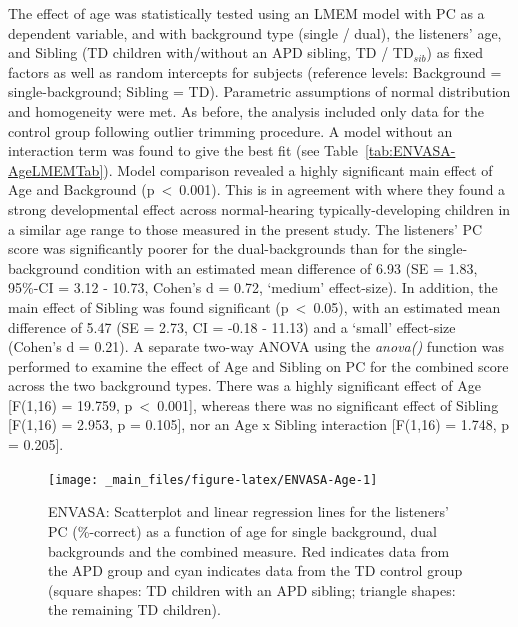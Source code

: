 \documentclass[a4paper, twoside]{templates/ociamthesis}
\begin{document}
The effect of age was statistically tested using an LMEM model with PC as a dependent variable, and with background type (single / dual), the listeners' age, and Sibling (TD children with/without an APD sibling, TD / TD\(_{sib}\)) as fixed factors as well as random intercepts for subjects (reference levels: Background = single-background; Sibling = TD). Parametric assumptions of normal distribution and homogeneity were met. As before, the analysis included only data for the control group following outlier trimming procedure. A model without an interaction term was found to give the best fit (see Table~\ref{tab:ENVASA-AgeLMEMTab}). Model comparison revealed a highly significant main effect of Age and Background (p~\textless~0.001). This is in agreement with \textcite{Krishnan2013} where they found a strong developmental effect across normal-hearing typically-developing children in a similar age range to those measured in the present study. The listeners' PC score was significantly poorer for the dual-backgrounds than for the single-background condition with an estimated mean difference of 6.93 (SE = 1.83, 95\%-CI = 3.12 - 10.73, Cohen's d = 0.72, `medium' effect-size). In addition, the main effect of Sibling was found significant (p~\textless~0.05), with an estimated mean difference of 5.47 (SE = 2.73, CI = -0.18 - 11.13) and a `small' effect-size (Cohen's d = 0.21). A separate two-way ANOVA using the \emph{anova()} function was performed to examine the effect of Age and Sibling on PC for the combined score across the two background types. There was a highly significant effect of Age {[}F(1,16) = 19.759, p~\textless~0.001{]}, whereas there was no significant effect of Sibling {[}F(1,16) = 2.953, p = 0.105{]}, nor an Age x Sibling interaction {[}F(1,16) = 1.748, p = 0.205{]}.\\

\begin{figure}

{\centering \texttt{[image: \_main\_files/figure-latex/ENVASA-Age-1]} 

}

\caption{ENVASA: Scatterplot and linear regression lines for the listeners' PC (\%-correct) as a function of age for single background, dual backgrounds and the combined measure. Red indicates data from the APD group and cyan indicates data from the TD control group (square shapes: TD children with an APD sibling; triangle shapes: the remaining TD children).}\label{fig:ENVASA-Age}
\end{figure}
\end{document}
